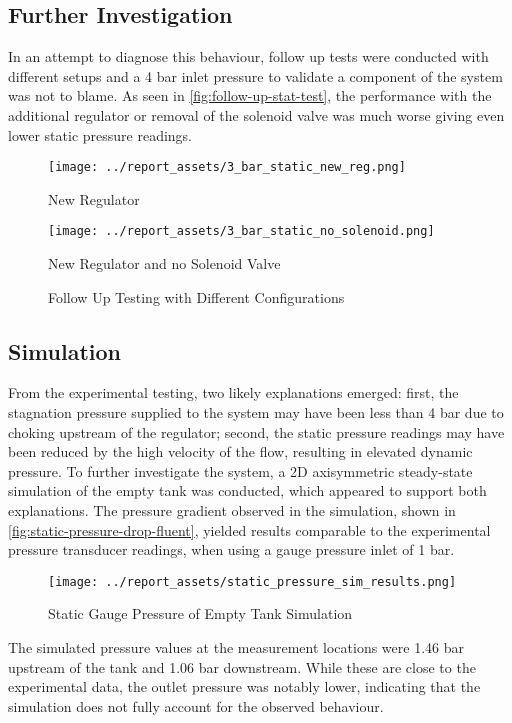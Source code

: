 \subsection{Further Investigation}
In an attempt to diagnose this behaviour, follow up tests were conducted with different setups and a 4 bar inlet pressure to validate a component of the system was not to blame. As seen in \autoref{fig:follow-up-stat-test}, the performance with the additional regulator or removal of the solenoid valve was much worse giving even lower static pressure readings. 
\begin{figure}[htbp]
    \centering

    \begin{minipage}{0.45\textwidth}
        \centering
        \texttt{[image: ../report\_assets/3\_bar\_static\_new\_reg.png]}
        \caption{New Regulator}\label{fig:static-pressure-drop-new-reg}
    \end{minipage}    
    \hfill
    \begin{minipage}{0.45\textwidth}
        \centering
        \texttt{[image: ../report\_assets/3\_bar\_static\_no\_solenoid.png]}
        \caption{New Regulator and no Solenoid Valve}\label{fig:static-pressure-drop-no-solenoid}
    \end{minipage}    
    \caption{Follow Up Testing with Different Configurations}\label{fig:follow-up-stat-test}
\end{figure}    


\subsection{Simulation}
From the experimental testing, two likely explanations emerged: first, the stagnation pressure supplied to the system may have been less than 4 bar due to choking upstream of the regulator; second, the static pressure readings may have been reduced by the high velocity of the flow, resulting in elevated dynamic pressure. To further investigate the system, a 2D axisymmetric steady-state simulation of the empty tank was conducted, which appeared to support both explanations. The pressure gradient observed in the simulation, shown in \autoref{fig:static-pressure-drop-fluent}, yielded results comparable to the experimental pressure transducer readings, when using a gauge pressure inlet of 1 bar.
\begin{figure}[htbp]
    \centering
    
    \begin{minipage}{0.9\textwidth}
        \centering
        \texttt{[image: ../report\_assets/static\_pressure\_sim\_results.png]}
        \caption{Static Gauge Pressure of Empty Tank Simulation}\label{fig:static-pressure-drop-fluent}
    \end{minipage}    
    
\end{figure}    
The simulated pressure values at the measurement locations were 1.46 bar upstream of the tank and 1.06 bar downstream. While these are close to the experimental data, the outlet pressure was notably lower, indicating that the simulation does not fully account for the observed behaviour.

